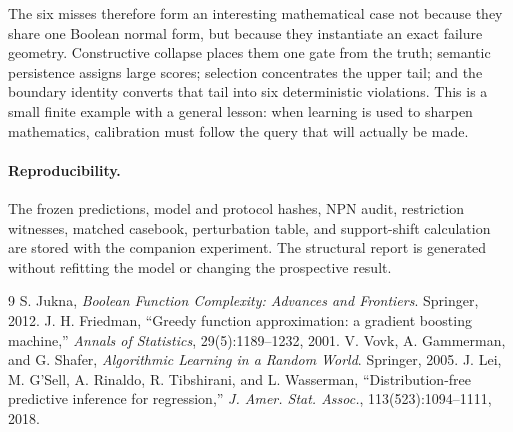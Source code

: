 \documentclass[11pt]{article}
\begin{document}
The six misses therefore form an interesting mathematical case not because
they share one Boolean normal form, but because they instantiate an exact
failure geometry.  Constructive collapse places them one gate from the truth;
semantic persistence assigns large scores; selection concentrates the upper
tail; and the boundary identity converts that tail into six deterministic
violations.  This is a small finite example with a general lesson: when
learning is used to sharpen mathematics, calibration must follow the query
that will actually be made.

\paragraph{Reproducibility.}
The frozen predictions, model and protocol hashes, NPN audit, restriction
witnesses, matched casebook, perturbation table, and support-shift calculation
are stored with the companion experiment.  The structural report is generated
without refitting the model or changing the prospective result.

\begingroup
\footnotesize
\setlength{\parskip}{0pt}
\begin{thebibliography}{9}
\setlength{\itemsep}{0pt}
S. Jukna, \emph{Boolean Function Complexity: Advances and Frontiers}.
Springer, 2012.
J. H. Friedman, ``Greedy function approximation: a gradient boosting
machine,'' \emph{Annals of Statistics}, 29(5):1189--1232, 2001.
V. Vovk, A. Gammerman, and G. Shafer, \emph{Algorithmic Learning in a Random
World}. Springer, 2005.
J. Lei, M. G'Sell, A. Rinaldo, R. Tibshirani, and L. Wasserman,
``Distribution-free predictive inference for regression,''
\emph{J. Amer. Stat. Assoc.}, 113(523):1094--1111, 2018.
\end{thebibliography}
\endgroup
\end{document}
